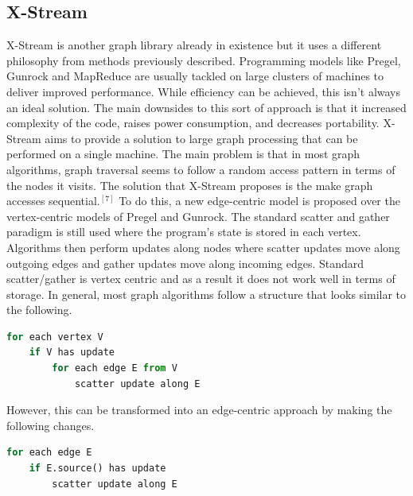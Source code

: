 \documentclass[conference]{IEEEtran}
\begin{document}
\subsection{X-Stream}
X-Stream is another graph library already in existence but it uses a different philosophy from methods previously described.  Programming models like Pregel, Gunrock and MapReduce are usually tackled on large clusters of machines to deliver improved performance.  While efficiency can be achieved, this isn't always an ideal solution.  The main downsides to this sort of approach is that it increased complexity of the code, raises power consumption, and decreases portability.  X-Stream aims to provide a solution to large graph processing that can be performed on a single machine.  The main problem is that in most graph algorithms, graph traversal seems to follow a random access pattern in terms of the nodes it visits.  The solution that X-Stream proposes is the make graph accesses sequential.$^{[7]}$  To do this, a new edge-centric model is proposed over the vertex-centric models of Pregel and Gunrock.  The standard scatter and gather paradigm is still used where the program's state is stored in each vertex.  Algorithms then perform updates along nodes where scatter updates move along outgoing edges and gather updates move along incoming edges.  Standard scatter/gather is vertex centric and as a result it does not work well in terms of storage.  In general, most graph algorithms follow a structure that looks similar to the following.  
\begin{lstlisting}[language=Python, caption=Vertex-centric Scatter/Gather]
for each vertex V
    if V has update
        for each edge E from V
            scatter update along E
\end{lstlisting}
However, this can be transformed into an edge-centric approach by making the following changes.  
\begin{lstlisting}[language=Python, caption=Edge-centric Scatter/Gather]
for each edge E
    if E.source() has update
        scatter update along E
\end{lstlisting}
\end{document}
